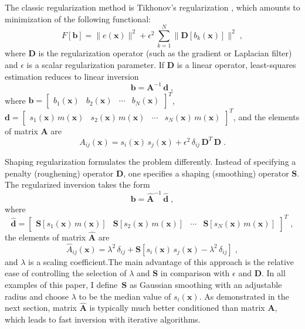 The classic regularization method is Tikhonov's regularization
\cite[]{tikhonov,engl}, which amounts to minimization of the following
functional:
\begin{equation}
  \label{eq:tikh}
  F[\mathbf{b}] = \|e(\mathbf{x})\|^2 + 
  \epsilon^2\,\sum_{k=1}^{N} \|\mathbf{D}\left[b_k(\mathbf{x})\right]\|^2\;,
\end{equation}
where $\mathbf{D}$ is the regularization operator (such as the
gradient or Laplacian filter) and $\epsilon$ is a scalar
regularization parameter. If $\mathbf{D}$ is a linear operator,
least-squares estimation reduces to linear inversion
\begin{equation}
  \label{eq:inv}
  \mathbf{b} = \mathbf{A}^{-1}\,\mathbf{d}\;,
\end{equation}
where $\mathbf{b} = \left[\begin{array}{cccc}b_1(\mathbf{x}) & b_2(\mathbf{x}) & \cdots & b_N(\mathbf{x})\end{array}\right]^T$, \\
$\mathbf{d} = \left[\begin{array}{cccc}s_1(\mathbf{x})\,m(\mathbf{x}) & s_2(\mathbf{x})\,m(\mathbf{x}) & \cdots & s_N(\mathbf{x})\,m(\mathbf{x})\end{array}\right]^T$,
and the elements of matrix $\mathbf{A}$ are
\begin{equation}
  \label{eq:aij}
  A_{ij}(\mathbf{x}) = s_i(\mathbf{x})\,s_j(\mathbf{x}) + \epsilon^2\,\delta_{ij}\,\mathbf{D}^T\,\mathbf{D}\;.
\end{equation}

Shaping regularization \cite[]{shape} formulates the problem
differently. Instead of specifying a penalty (roughening) operator
$\mathbf{D}$, one specifies a shaping (smoothing) operator $\mathbf{S}$.
The regularized inversion takes the form
\begin{equation}
  \label{eq:rinv}
  \mathbf{b} = \widehat{\mathbf{A}}^{-1}\,\widehat{\mathbf{d}}\;,
\end{equation}
where 
\[
\widehat{\mathbf{d}} = \left[\begin{array}{cccc}\mathbf{S}\left[s_1(\mathbf{x})\,m(\mathbf{x})\right] & 
\mathbf{S}\left[s_2(\mathbf{x})\,m(\mathbf{x})\right] & \cdots & 
\mathbf{S}\left[s_N(\mathbf{x})\,m(\mathbf{x})\right]\end{array}\right]^T\;,
\]
the elements of matrix $\widehat{\mathbf{A}}$ are
\begin{equation}
  \label{eq:raij}
  \widehat{A}_{ij}(\mathbf{x}) = \lambda^2\,\delta_{ij} + 
  \mathbf{S}\left[s_i(\mathbf{x})\,s_j(\mathbf{x}) - 
    \lambda^2\,\delta_{ij}\right]\;,
\end{equation}
and $\lambda$ is a scaling coefficient.The main advantage of this
approach is the relative ease of controlling the selection of
$\lambda$ and $\mathbf{S}$ in comparison with $\epsilon$ and
$\mathbf{D}$.  In all examples of this paper, I define~$\mathbf{S}$ as
Gaussian smoothing with an adjustable radius and choose $\lambda$ to
be the median value of $s_i(\mathbf{x})$. As demonstrated in the next
section, matrix $\widehat{\mathbf{A}}$ is typically much better
conditioned than matrix $\mathbf{A}$, which leads to fast inversion
with iterative algorithms.

